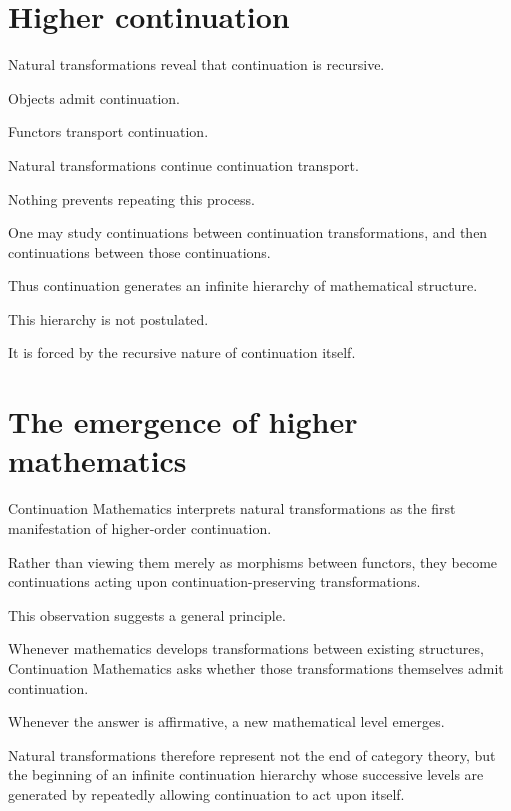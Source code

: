 \documentclass[13pt,openany]{book}
\theoremstyle{plain}
\theoremstyle{definition}
\begin{document}
\section{Higher continuation}

Natural transformations reveal that continuation is recursive.

Objects admit continuation.

Functors transport continuation.

Natural transformations continue continuation transport.

Nothing prevents repeating this process.

One may study continuations between continuation transformations, and then
continuations between those continuations.

Thus continuation generates an infinite hierarchy of mathematical structure.

This hierarchy is not postulated.

It is forced by the recursive nature of continuation itself.

\section{The emergence of higher mathematics}

Continuation Mathematics interprets natural transformations as the first
manifestation of higher-order continuation.

Rather than viewing them merely as morphisms between functors, they become
continuations acting upon continuation-preserving transformations.

This observation suggests a general principle.

Whenever mathematics develops transformations between existing structures,
Continuation Mathematics asks whether those transformations themselves admit
continuation.

Whenever the answer is affirmative, a new mathematical level emerges.

Natural transformations therefore represent not the end of category theory, but
the beginning of an infinite continuation hierarchy whose successive levels are
generated by repeatedly allowing continuation to act upon itself.
\end{document}

